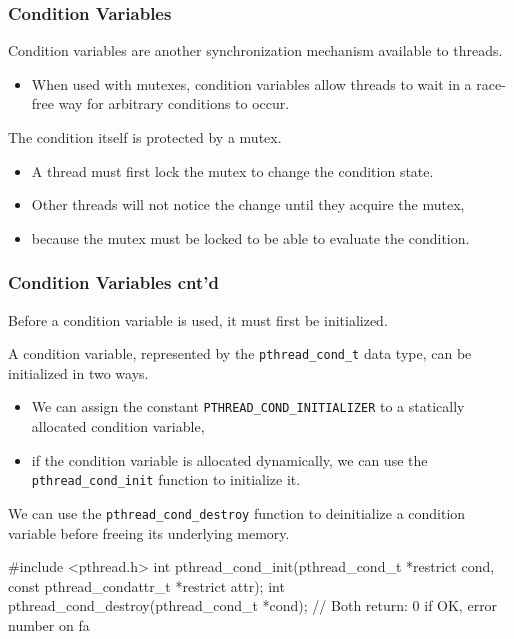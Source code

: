 \documentclass[newPxFont,sthlmFooter,nooffset]{beamer}
\begin{document}
\begin{frame}[t]
  \frametitle{Condition Variables}
Condition variables are another synchronization mechanism available to threads.
\begin{itemize}
\item When used with mutexes, condition variables allow threads to
  wait in a race-free way for arbitrary conditions to occur.
\end{itemize}

The condition itself is protected by a mutex.
\begin{itemize}
\item A thread must first lock the mutex to change the condition
  state.
\item Other threads will not notice the change until they acquire
  the mutex,
\item because the mutex must be locked to be able to evaluate
  the condition.
\end{itemize}

\end{frame}



\begin{frame}[t, fragile]
  \frametitle{Condition Variables cnt'd}
Before a condition variable is used, it must first be initialized.

A condition variable, represented by the \texttt{pthread\_cond\_t} data type, can be initialized in two ways. 
\begin{itemize}
\item We can assign the constant \texttt{PTHREAD\_COND\_INITIALIZER} to a
  statically allocated condition variable,
\item if the condition variable is allocated dynamically, we can use
  the \texttt{pthread\_cond\_init} function to initialize it.
\end{itemize}

We can use the \texttt{pthread\_cond\_destroy} function to deinitialize a condition variable before freeing its underlying memory.

\begin{codedef}
#include <pthread.h>
int pthread_cond_init(pthread_cond_t *restrict cond,
                      const pthread_condattr_t *restrict attr); 
int pthread_cond_destroy(pthread_cond_t *cond);
// Both return: 0 if OK, error number on fa
\end{codedef}

\end{frame}
\end{document}
